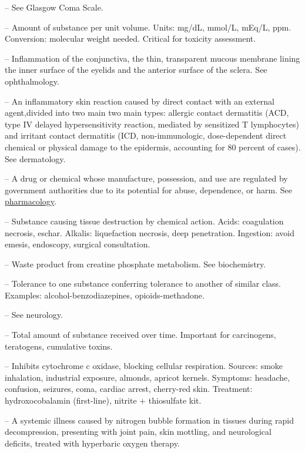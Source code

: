 -- See Glasgow Coma Scale.

-- Amount of substance per unit volume. Units: mg/dL, mmol/L, mEq/L, ppm. Conversion: molecular weight needed. Critical for toxicity assessment.

-- Inflammation of the conjunctiva, the thin, transparent mucous membrane lining the inner surface of the eyelids and the anterior surface of the sclera. See ophthalmology.

-- An inflammatory skin reaction caused by direct contact with an external agent,divided into two main two main types: allergic contact dermatitis (ACD, type IV delayed hypersensitivity reaction, mediated by sensitized T lymphocytes) and irritant contact dermatitis (ICD, non-immunologic, dose-dependent direct chemical or physical damage to the epidermis, accounting for 80 percent of cases). See dermatology.

-- A drug or chemical whose manufacture, possession, and use are regulated by government authorities due to its potential for abuse, dependence, or harm. See \hyperlink{Pharmacology}{pharmacology}.

-- Substance causing tissue destruction by chemical action. Acids: coagulation necrosis, eschar. Alkalis: liquefaction necrosis, deep penetration. Ingestion: avoid emesis, endoscopy, surgical consultation.

-- Waste product from creatine phosphate metabolism. See biochemistry.

-- Tolerance to one substance conferring tolerance to another of similar class. Examples: alcohol-benzodiazepines, opioids-methadone.

-- See neurology.

-- Total amount of substance received over time. Important for carcinogens, teratogens, cumulative toxins.

-- Inhibits cytochrome c oxidase, blocking cellular respiration. Sources: smoke inhalation, industrial exposure, almonds, apricot kernels. Symptoms: headache, confusion, seizures, coma, cardiac arrest, cherry-red skin. Treatment: hydroxocobalamin (first-line), nitrite + thiosulfate kit.

-- A systemic illness caused by nitrogen bubble formation in tissues during rapid decompression, presenting with joint pain, skin mottling, and neurological deficits, treated with hyperbaric oxygen therapy.

